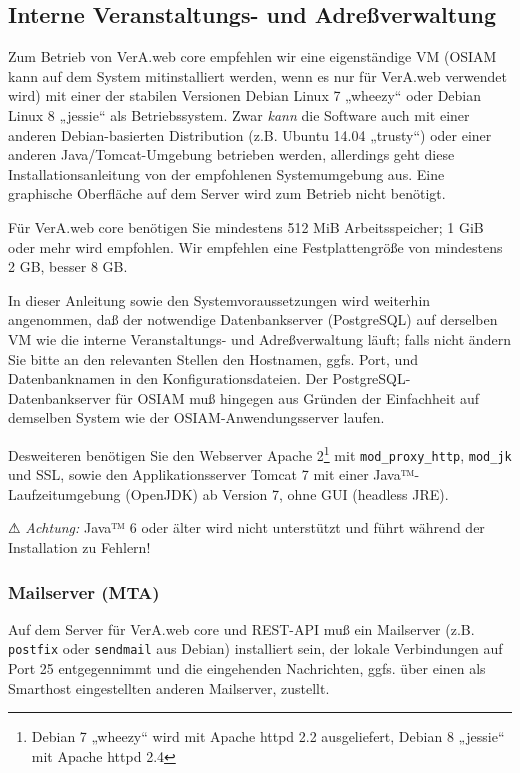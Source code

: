 \subsection{Interne Veranstaltungs- und Adreßverwaltung}\label{subsec:req-core}

Zum Betrieb von VerA.web core empfehlen wir eine eigenständige VM
\ifoa
(OSIAM kann auf dem System mitinstalliert werden, wenn es nur für
VerA.web verwendet wird)
\fi%
mit einer der stabilen Versionen Debian Linux 7 „wheezy“ oder Debian
Linux 8 „jessie“ als Betriebssystem. Zwar \emph{kann}
die Software auch mit einer anderen Debian-basierten Distribution
(z.B. Ubuntu 14.04 „trusty“) oder einer anderen Java/Tomcat-Umgebung
betrieben werden, allerdings geht diese Installationsanleitung von
der empfohlenen Systemumgebung aus. Eine graphische Oberfläche auf
dem Server wird zum Betrieb nicht benötigt.

Für VerA.web core benötigen Sie mindestens 512 MiB Arbeitsspeicher;
1 GiB oder mehr wird empfohlen. Wir empfehlen eine Festplattengröße
von mindestens 2 GB, besser 8 GB.

In dieser Anleitung sowie den Systemvoraussetzungen wird weiterhin
angenommen, daß der notwendige Datenbankserver (PostgreSQL) auf
derselben VM wie die interne Veranstaltungs- und Adreßverwaltung läuft;
falls nicht ändern Sie bitte an den relevanten Stellen den Hostnamen,
ggfs. Port, und Datenbanknamen in den Konfigurationsdateien.
\ifoa
Der PostgreSQL-Datenbankserver für OSIAM muß hingegen aus Gründen der
Einfachheit auf demselben System wie der OSIAM-Anwendungsserver laufen.
\fi%

Desweiteren benötigen Sie den Webserver Apache 2\Hair\footnote
{\label{fn:apache}Debian 7 „wheezy“ wird mit Apache httpd 2.2
ausgeliefert, Debian 8 „jessie“ mit Apache httpd 2.4} mit
\ifoa
\texttt{mod\_proxy\_http},
\fi%
\texttt{mod\_jk} und SSL, sowie den Applikationsserver Tomcat 7
mit einer Java™-Laufzeitumgebung (OpenJDK) ab Version 7, ohne GUI
(headless JRE).

⚠ \emph{Achtung:} Java™ 6 oder älter wird nicht unterstützt
und führt während der Installation zu Fehlern!

\subsubsection{Mailserver (MTA)}\label{subsubsec:req-core-mta}

Auf dem Server für VerA.web core und REST-API muß ein Mailserver
(z.B. \texttt{postfix} oder \texttt{sendmail} aus Debian)
installiert sein, der lokale Verbindungen auf Port 25 entgegennimmt
und die eingehenden Nachrichten, ggfs. über einen als Smarthost
eingestellten anderen Mailserver, zustellt.

